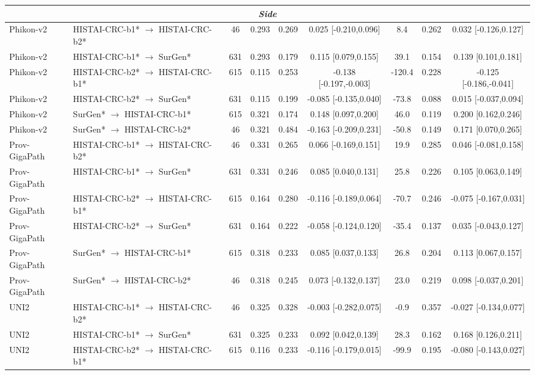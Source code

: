 \begin{table}[htbp]
{\begin{tabular}{l l c c c c c c c}
\midrule
\multicolumn{9}{c}{\textit{Side}} \\
\midrule
Phikon-v2 & HISTAI-CRC-b1* $\rightarrow$ HISTAI-CRC-b2* & 46 & 0.293 & 0.269 & 0.025 [-0.210,0.096] & 8.4 & 0.262 & 0.032 [-0.126,0.127] \\
Phikon-v2 & HISTAI-CRC-b1* $\rightarrow$ SurGen* & 631 & 0.293 & 0.179 & 0.115 [0.079,0.155] & 39.1 & 0.154 & 0.139 [0.101,0.181] \\
Phikon-v2 & HISTAI-CRC-b2* $\rightarrow$ HISTAI-CRC-b1* & 615 & 0.115 & 0.253 & -0.138 [-0.197,-0.003] & -120.4 & 0.228 & -0.125 [-0.186,-0.041] \\
Phikon-v2 & HISTAI-CRC-b2* $\rightarrow$ SurGen* & 631 & 0.115 & 0.199 & -0.085 [-0.135,0.040] & -73.8 & 0.088 & 0.015 [-0.037,0.094] \\
Phikon-v2 & SurGen* $\rightarrow$ HISTAI-CRC-b1* & 615 & 0.321 & 0.174 & 0.148 [0.097,0.200] & 46.0 & 0.119 & 0.200 [0.162,0.246] \\
Phikon-v2 & SurGen* $\rightarrow$ HISTAI-CRC-b2* & 46 & 0.321 & 0.484 & -0.163 [-0.209,0.231] & -50.8 & 0.149 & 0.171 [0.070,0.265] \\
Prov-GigaPath & HISTAI-CRC-b1* $\rightarrow$ HISTAI-CRC-b2* & 46 & 0.331 & 0.265 & 0.066 [-0.169,0.151] & 19.9 & 0.285 & 0.046 [-0.081,0.158] \\
Prov-GigaPath & HISTAI-CRC-b1* $\rightarrow$ SurGen* & 631 & 0.331 & 0.246 & 0.085 [0.040,0.131] & 25.8 & 0.226 & 0.105 [0.063,0.149] \\
Prov-GigaPath & HISTAI-CRC-b2* $\rightarrow$ HISTAI-CRC-b1* & 615 & 0.164 & 0.280 & -0.116 [-0.189,0.064] & -70.7 & 0.246 & -0.075 [-0.167,0.031] \\
Prov-GigaPath & HISTAI-CRC-b2* $\rightarrow$ SurGen* & 631 & 0.164 & 0.222 & -0.058 [-0.124,0.120] & -35.4 & 0.137 & 0.035 [-0.043,0.127] \\
Prov-GigaPath & SurGen* $\rightarrow$ HISTAI-CRC-b1* & 615 & 0.318 & 0.233 & 0.085 [0.037,0.133] & 26.8 & 0.204 & 0.113 [0.067,0.157] \\
Prov-GigaPath & SurGen* $\rightarrow$ HISTAI-CRC-b2* & 46 & 0.318 & 0.245 & 0.073 [-0.132,0.137] & 23.0 & 0.219 & 0.098 [-0.037,0.201] \\
UNI2 & HISTAI-CRC-b1* $\rightarrow$ HISTAI-CRC-b2* & 46 & 0.325 & 0.328 & -0.003 [-0.282,0.075] & -0.9 & 0.357 & -0.027 [-0.134,0.077] \\
UNI2 & HISTAI-CRC-b1* $\rightarrow$ SurGen* & 631 & 0.325 & 0.233 & 0.092 [0.042,0.139] & 28.3 & 0.162 & 0.168 [0.126,0.211] \\
UNI2 & HISTAI-CRC-b2* $\rightarrow$ HISTAI-CRC-b1* & 615 & 0.116 & 0.233 & -0.116 [-0.179,0.015] & -99.9 & 0.195 & -0.080 [-0.143,0.027] \\

\end{tabular}}
\end{table}
